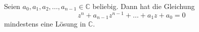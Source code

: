 Seien $a_0, a_1, a_2, \dots, a_{n-1} \in \mathbb{C}$ beliebig. Dann hat die Gleichung
$$z^n + a_{n-1}z^{n-1} + \dots + a_1z + a_0 = 0$$
mindestens eine Lösung in $\mathbb{C}$. 